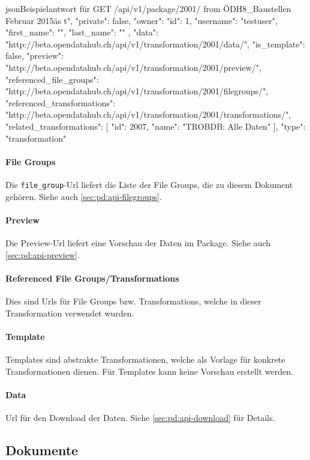 \begin{srclst}[label=pd:api-package-transformation]{json}{Beispielantwort für GET /api/v1/package/2001/}
{           from \"ODH8_Baustellen Februar 2015\" as t", 
    "private": false, 
    "owner": {
        "id": 1, 
        "username": "testuser", 
        "first_name": "", 
        "last_name": ""
    }, 
    "data": "http://beta.opendatahub.ch/api/v1/transformation/2001/data/", 
    "is_template": false, 
    "preview": "http://beta.opendatahub.ch/api/v1/transformation/2001/preview/", 
    "referenced_file_groups": "http://beta.opendatahub.ch/api/v1/transformation/2001/filegroups/", 
    "referenced_transformations": "http://beta.opendatahub.ch/api/v1/transformation/2001/transformations/", 
    "related_transformations": [
        {
            "id": 2007, 
            "name": "TROBDB: Alle Daten"
        }
    ], 
    "type": "transformation"
}
\end{srclst}

\paragraph{File Groups} Die \texttt{file\_group}-Url liefert die Liste der File Groups, die zu diesem Dokument gehören. Siehe auch \cref{sec:pd:api-filegroups}.

\paragraph{Preview} Die Preview-Url liefert eine Vorschau der Daten im Package. Siehe auch \cref{sec:pd:api-preview}.

\paragraph{Referenced File Groups/Transformations} Dies sind Urls für File Groups bzw. Transformations, welche in dieser Transformation verwendet wurden.

\paragraph{Template} Templates sind abstrakte Transformationen, welche als Vorlage für konkrete Transformationen dienen. Für Templates kann keine Vorschau erstellt werden.

\paragraph{Data} Url für den Download der Daten. Siehe \cref{sec:pd:api-download} für Details.

\subsection{Dokumente}
